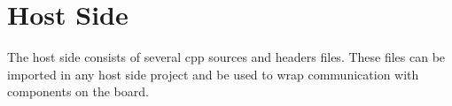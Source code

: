 \documentclass{report}
\begin{document}
\section{Host Side}
The host side consists of several cpp sources and headers files. These files can be imported in any host side project and be used to wrap communication with components on the board.

%
%
%
%
%
%
%
%
%
%
%
\end{document}
